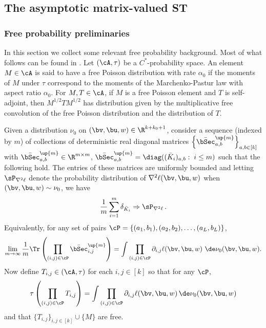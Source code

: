 \subsection{The asymptotic matrix-valued ST}
\label{sec:AsymptoticST}

\subsubsection{Free probability preliminaries}

In this section we collect some relevant free probability background. Most of what follows can be found in
\cite{nica2006lectures,mingo2017free}.
Let $(\cA,\tau)$ be a $C^*$-probability space.
An element $M\in\cA$ is said to have a free Poisson distribution with rate $\alpha_0$ if the moments of $M$ under $\tau$ correspond to the moments of the Marchenko-Pastur law with aspect ratio $\alpha_0$. For $M,T \in\cA$, if $M$ is a free Poisson element and $T$ is self-adjoint, then $M^{1/2} T M^{1/2}$ has distribution given by the multiplicative free convolution of the free Poisson distribution and the distribution of $T$. 


Given a distribution $\nu_{0}$ on $(\bv,\bu, w) \in\R^{k+k_0+1}$, 
consider a sequence (indexed by $m$)
of collections of deterministic real diagonal matrices $\left\{\bar\bSec_{a,b}^\up{m}\right\}_{a,b\in[k]}$ with
$\bar\bSec_{a,b}^\up{m}\in \R^{m\times m}$,
$\bar\bSec_{a,b}^\up{m} = \diag((\bar K_i)_{a,b}:\; i\le m)$
such that the following hold.
The entries of these matrices are uniformly bounded and
letting $\sP_{\nabla^2 \ell}$ denote the probability distribution
of $\nabla^2\ell(\bv,\bu, w)$ when $(\bv,\bu, w) \sim\nu_0$,
we have
%
\begin{align}
\nonumber
\frac{1}{m}\sum_{i=1}^m\delta_{\bar K_i} \Rightarrow 
\sP_{\nabla^2 \ell}\, .
\end{align}
%
Equivalently, for any set of pairs 
$\cP= \{ (a_1,b_1),(a_2,b_2),\dots, (a_L,b_L)\}$, 
\begin{equation}
\label{eq:K_empirical_limit}
    \lim_{m\to\infty} \frac1m \Tr\left( \prod_{(i,j) \in \cP} 
   \bar \bSec_{i,j}^\up{m}
    \right) = \int \prod_{(i,j)\in\cP}  \partial_{i,j}\ell(\bv,\bu, w)  \, \, \de\nu_{0}(\bv,\bu,w).
\end{equation}
Now define $T_{i,j}\in(\cA,\tau)$ for each $i,j\in [k]$
so that for any $\cP$,
%
\begin{equation}
\label{eq:taus_of_prods_of_D}
     \tau\left( \prod_{(i,j) \in \cP} 
   T_{i,j}
    \right) = \int \prod_{(i,j)\in\cP}  \partial_{i,j}\ell(\bv,\bu,w) \,  \de\nu_{0}(\bv,\bu, w)
\end{equation}
and that $\{T_{i,j}\}_{i,j\in [k]}\cup \{M\}$ are free.

